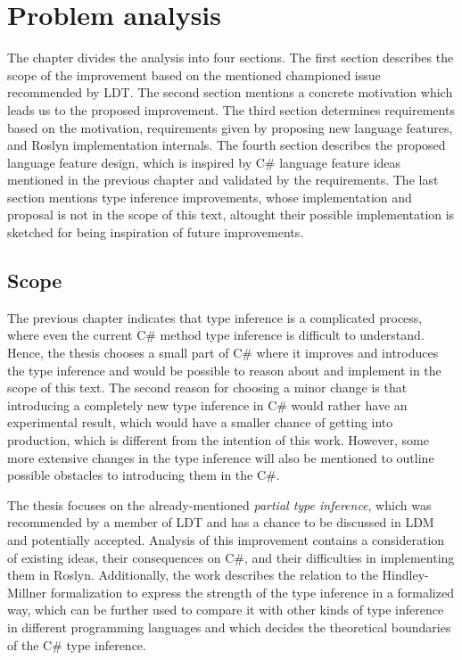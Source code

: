 \chapter{Problem analysis}
The chapter divides the analysis into four sections. 
The first section describes the scope of the improvement based on the mentioned championed issue recommended by \ac{LDT}. 
The second section mentions a concrete motivation which leads us to the proposed improvement. 
The third section determines requirements based on the motivation, requirements given by proposing new language features, and Roslyn implementation internals. 
The fourth section describes the proposed language feature design, which is inspired by C\# language feature ideas mentioned in the previous chapter and validated by the requirements.
The last section mentions type inference improvements, whose implementation and proposal is not in the scope of this text, altought their possible implementation is sketched for being inspiration of future improvements. 

\section{Scope}
The previous chapter indicates that type inference is a complicated process, where even the current C\# method type inference is difficult to understand. 
Hence, the thesis chooses a small part of C\# where it improves and introduces the type inference and would be possible to reason about and implement in the scope of this text. 
The second reason for choosing a minor change is that introducing a completely new type inference in C\# would rather have an experimental result, which would have a smaller chance of getting into production, which is different from the intention of this work. 
However, some more extensive changes in the type inference will also be mentioned to outline possible obstacles to introducing them in the C\#.
\par
{}
The thesis focuses on the already-mentioned \textit{partial type inference}, which was recommended by a member of \ac{LDT} and has a chance to be discussed in \ac{LDM} and potentially accepted. 
Analysis of this improvement contains a consideration of existing ideas, their consequences on C\#, and their difficulties in implementing them in Roslyn. 
Additionally, the work describes the relation to the Hindley-Millner formalization to express the strength of the type inference in a formalized way, which can be further used to compare it with other kinds of type inference in different programming languages and which decides the theoretical boundaries of the C\# type inference.

